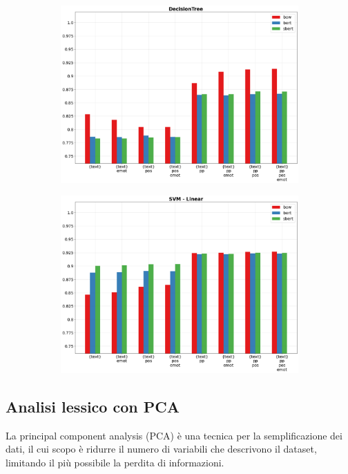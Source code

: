 \documentclass[oneside]{book}
\begin{document}
\begin{figure}[!h]
	\hspace*{-3cm}
	\begin{subfigure}[b]{0.5\textwidth}
		\centering
		\includegraphics[width=10cm]{assets/reports/text/f1/DecisionTree.png}
	\end{subfigure}
	\hfill
	\begin{subfigure}[b]{0.5\textwidth}		
		\centering
		\hspace*{0.15cm}
		\includegraphics[width=10cm]{assets/reports/text/f1/SVM - Linear.png}
	\end{subfigure}
\end{figure}
\newpage


\subsection{Analisi lessico con PCA}
La principal component analysis (PCA) è una tecnica per la semplificazione dei dati, il cui scopo è ridurre il numero di variabili che descrivono il dataset, limitando il più possibile la perdita di informazioni.
\end{document}
